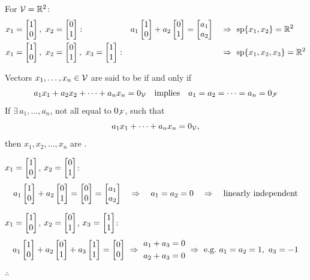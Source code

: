 For $\mathcal{V}=\mathbb{R}^2$:
\begin{align*}
&x_1=\bmat{1\\0},\ x_2=\bmat{0\\1}: && a_1\bmat{1\\0}+a_2\bmat{0\\1} = \bmat{a_1\\a_2} &&\Rightarrow\ \Span\{x_1,x_2\}=\R^2\\
&x_1=\bmat{1\\0},\ x_2=\bmat{0\\1},\ x_3=\bmat{1\\1}: && && \Rightarrow\ \Span\{x_1,x_2,x_3\}=\R^2
\end{align*}

\begin{definition}
Vectors $x_1,\dots,x_n\in\mathcal{V}$ are said to be  if and only if
\[ a_1x_1+a_2x_2+\dots+a_nx_n = 0_{\mathcal{V}} \quad\text{implies}\quad a_1=a_2=\dots=a_n=0_{\mathcal{F}} \]
If $\exists\, a_1,\dots,a_n$, not all equal to $0_{\mathcal{F}}$, such that
\[ a_1x_1+\dots+a_nx_n = 0_{\mathcal{V}}, \]
then $x_1,x_2,\dots,x_n$ are .
\end{definition}

\begin{example}
$x_1=\begin{bmatrix}1\\0\end{bmatrix}$, $x_2=\begin{bmatrix}0\\1\end{bmatrix}$:
\[
a_1\begin{bmatrix}1\\0\end{bmatrix}+a_2\begin{bmatrix}0\\1\end{bmatrix} = \begin{bmatrix}0\\0\end{bmatrix} = \begin{bmatrix}a_1\\a_2\end{bmatrix}
\quad\Rightarrow\quad a_1=a_2=0 \quad\Rightarrow\quad \text{linearly independent}
\]
\end{example}

\begin{example}
$x_1=\begin{bmatrix}1\\0\end{bmatrix}$, $x_2=\begin{bmatrix}0\\1\end{bmatrix}$, $x_3=\begin{bmatrix}1\\1\end{bmatrix}$:
\[
a_1\begin{bmatrix}1\\0\end{bmatrix}+a_2\begin{bmatrix}0\\1\end{bmatrix}+a_3\begin{bmatrix}1\\1\end{bmatrix} = \begin{bmatrix}0\\0\end{bmatrix}
\ \Rightarrow\
\begin{aligned} a_1+a_3&=0\\ a_2+a_3&=0 \end{aligned}
\ \Rightarrow\
\text{e.g.\ } a_1=a_2=1,\ a_3=-1
\]
$\therefore$ 
\end{example}

